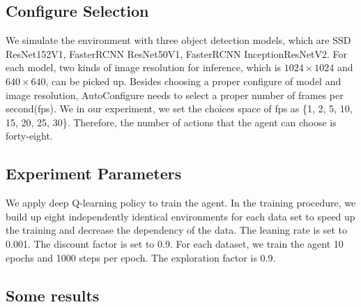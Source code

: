 \subsection{Configure Selection}
We simulate the environment with three object detection models, which are SSD ResNet152V1, FasterRCNN ResNet50V1, FasterRCNN InceptionResNetV2. For each model, two kinds of image resolution for inference, which is $1024\times1024$ and $640\times640$, can be picked up. Besides choosing a proper configure of model and image resolution, AutoConfigure needs to select a proper number of frames per second(fps). We in our experiment, we set the choices space of fps as \{1, 2, 5, 10, 15, 20, 25, 30\}. Therefore, the number of actions that the agent can choose is forty-eight.
\subsection{Experiment Parameters}
We apply deep Q-learning policy to train the agent. In the training procedure, we build up eight independently identical environments for each data set to speed up the training and decrease the dependency of the data. The leaning rate is set to 0.001. The discount factor is set to 0.9. For each dataset, we train the agent 10 epochs and 1000 steps per epoch. The exploration factor is 0.9.
\subsection{Some results}

